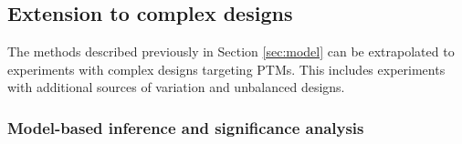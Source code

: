 \documentclass{mcp}
\begin{document}
%

\subsection{Extension to complex designs}
\label{sec:complex_methods}

The methods described previously in Section \ref{sec:model} can be extrapolated to experiments with complex designs targeting PTMs. This includes experiments with additional sources of variation and unbalanced designs.

\subsubsection{Model-based inference and significance analysis}
\end{document}
